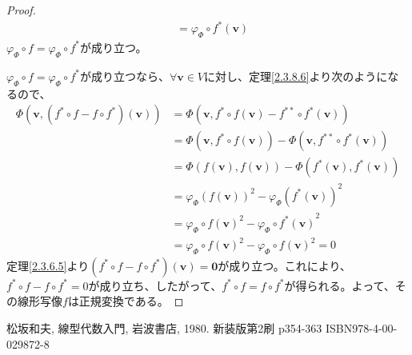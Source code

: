 \documentclass[dvipdfmx]{jsarticle}
\begin{document}
\begin{proof}
\begin{align*}
&= \varphi_{\varPhi} \circ f^{*}\left( \mathbf{v} \right)
\end{align*}
$\varphi_{\varPhi} \circ f = \varphi_{\varPhi} \circ f^{*}$が成り立つ。\par
$\varphi_{\varPhi} \circ f = \varphi_{\varPhi} \circ f^{*}$が成り立つなら、$\forall\mathbf{v} \in V$に対し、定理\ref{2.3.8.6}より次のようになるので、
\begin{align*}
\varPhi\left( \mathbf{v},\left( f^{*} \circ f - f \circ f^{*} \right)\left( \mathbf{v} \right) \right) &= \varPhi\left( \mathbf{v},f^{*} \circ f\left( \mathbf{v} \right) - f^{**} \circ f^{*}\left( \mathbf{v} \right) \right)\\
&= \varPhi\left( \mathbf{v},f^{*} \circ f\left( \mathbf{v} \right) \right) - \varPhi\left( \mathbf{v},f^{**} \circ f^{*}\left( \mathbf{v} \right) \right)\\
&= \varPhi\left( f\left( \mathbf{v} \right),f\left( \mathbf{v} \right) \right) - \varPhi\left( f^{*}\left( \mathbf{v} \right),f^{*}\left( \mathbf{v} \right) \right)\\
&= {\varphi_{\varPhi}\left( f\left( \mathbf{v} \right) \right)}^{2} - {\varphi_{\varPhi}\left( f^{*}\left( \mathbf{v} \right) \right)}^{2}\\
&= {\varphi_{\varPhi} \circ f\left( \mathbf{v} \right)}^{2} - {\varphi_{\varPhi} \circ f^{*}\left( \mathbf{v} \right)}^{2}\\
&= {\varphi_{\varPhi} \circ f\left( \mathbf{v} \right)}^{2} - {\varphi_{\varPhi} \circ f\left( \mathbf{v} \right)}^{2} = 0
\end{align*}
定理\ref{2.3.6.5}より$\left( f^{*} \circ f - f \circ f^{*} \right)\left( \mathbf{v} \right) = \mathbf{0}$が成り立つ。これにより、$f^{*} \circ f - f \circ f^{*} = 0$が成り立ち、したがって、$f^{*} \circ f = f \circ f^{*}$が得られる。よって、その線形写像$f$は正規変換である。
\end{proof}
\begin{thebibliography}{50}
  松坂和夫, 線型代数入門, 岩波書店, 1980. 新装版第2刷 p354-363 ISBN978-4-00-029872-8
\end{thebibliography}
\end{document}
